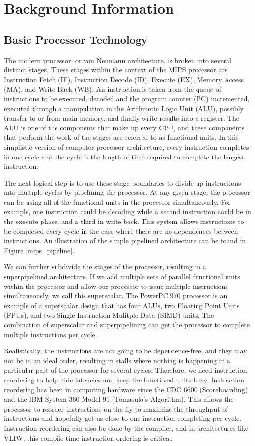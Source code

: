 \documentclass[12pt,twoside,letterpaper]{article}
\begin{document}
\section*{Background Information}
\subsection*{Basic Processor Technology}
The modern processor, or von Neumann architecture, is broken into several distinct stages. These stages within the context of the MIPS processor are Instruction Fetch (IF), Instruction Decode (ID), Execute (EX), Memory Access (MA), and Write Back (WB). An instruction is taken from the queue of instructions to be executed, decoded and the program counter (PC) incremented, executed through a manipulation in the Arithmetic Logic Unit (ALU), possibly transfer to or from main memory, and finally write results into a register. The ALU is one of the components that make up every CPU, and these components that perform the work of the stages are referred to as functional units. In this simplistic version of computer processor architecture, every instruction completes in one-cycle and the cycle is the length of time required to complete the longest instruction. 

The next logical step is to use these stage boundaries to divide up instructions into multiple cycles by pipelining the processor. At any given stage, the processor can be using all of the functional units in the processor simultaneously. For example, one instruction could be decoding while a second instruction could be in the execute phase, and a third in write back. This system allows instructions to be completed every cycle in the case where there are no dependences between instructions. An illustration of the simple pipelined architecture can be found in Figure \ref{mips_pipeline}.

We can further subdivide the stages of the processor, resulting in a superpipelined architecture. If we add multiple sets of parallel functional units within the processor and allow our processor to issue multiple instructions simultaneously, we call this superscalar. The PowerPC 970 processor is an example of a superscalar design that has four ALUs, two Floating Point Units (FPUs), and two Single Instruction Mulitple Data (SIMD) units. The combination of superscalar and superpipelining can get the processor to complete multiple instructions per cycle.

Realistically, the instructions are not going to be dependence-free, and they may not be in an ideal order, resulting in stalls where nothing is happening in a particular part of the processor for several cycles. Therefore, we need instruction reordering to help hide latencies and keep the functional units busy. Instruction reordering has been in computing hardware since the CDC 6600 (Scoreboarding) and the IBM System 360 Model 91 (Tomasulo's Algorithm). This allows the processor to reorder instructions on-the-fly to maximize the throughput of instructions and hopefully get us close to one instruction completing per cycle. Instruction reordering can also be done by the compiler, and in architectures like VLIW, this compile-time instruction ordering is critical.
\end{document}
